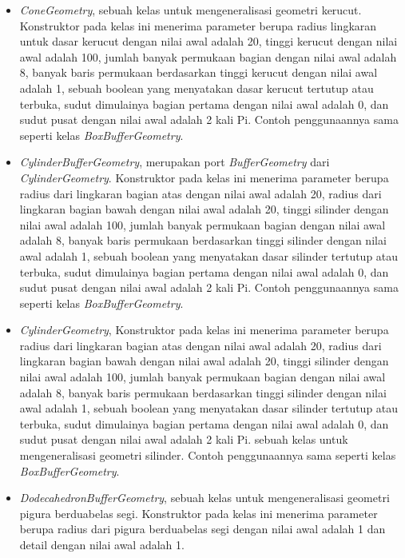 \begin{itemize}
\begin{itemize}
	\item {\it ConeGeometry}, sebuah kelas untuk mengeneralisasi geometri kerucut. Konstruktor pada kelas ini menerima parameter berupa radius lingkaran untuk dasar kerucut dengan nilai awal adalah 20, tinggi kerucut dengan nilai awal adalah 100, jumlah banyak permukaan bagian dengan nilai awal adalah 8, banyak baris permukaan berdasarkan tinggi kerucut dengan nilai awal adalah 1, sebuah boolean yang menyatakan dasar kerucut tertutup atau terbuka, sudut dimulainya bagian pertama dengan nilai awal adalah 0, dan sudut pusat dengan nilai awal adalah 2 kali Pi. Contoh penggunaannya sama seperti kelas {\it BoxBufferGeometry}.
	
	\item {\it CylinderBufferGeometry}, merupakan port {\it BufferGeometry} dari {\it CylinderGeometry}. Konstruktor pada kelas ini menerima parameter berupa radius dari lingkaran bagian atas dengan nilai awal adalah 20, radius dari lingkaran bagian bawah dengan nilai awal adalah 20, tinggi silinder dengan nilai awal adalah 100, jumlah banyak permukaan bagian dengan nilai awal adalah 8, banyak baris permukaan berdasarkan tinggi silinder dengan nilai awal adalah 1, sebuah boolean yang menyatakan dasar silinder tertutup atau terbuka, sudut dimulainya bagian pertama dengan nilai awal adalah 0, dan sudut pusat dengan nilai awal adalah 2 kali Pi. Contoh penggunaannya sama seperti kelas {\it BoxBufferGeometry}.
	
	\item {\it CylinderGeometry}, Konstruktor pada kelas ini menerima parameter berupa radius dari lingkaran bagian atas dengan nilai awal adalah 20, radius dari lingkaran bagian bawah dengan nilai awal adalah 20, tinggi silinder dengan nilai awal adalah 100, jumlah banyak permukaan bagian dengan nilai awal adalah 8, banyak baris permukaan berdasarkan tinggi silinder dengan nilai awal adalah 1, sebuah boolean yang menyatakan dasar silinder tertutup atau terbuka, sudut dimulainya bagian pertama dengan nilai awal adalah 0, dan sudut pusat dengan nilai awal adalah 2 kali Pi. sebuah kelas untuk mengeneralisasi geometri silinder. Contoh penggunaannya sama seperti kelas {\it BoxBufferGeometry}.

	\item {\it DodecahedronBufferGeometry}, sebuah kelas untuk mengeneralisasi geometri pigura berduabelas segi. Konstruktor pada kelas ini menerima parameter berupa radius dari pigura berduabelas segi dengan nilai awal adalah 1 dan detail dengan nilai awal adalah 1.


\end{itemize}
\end{itemize}
